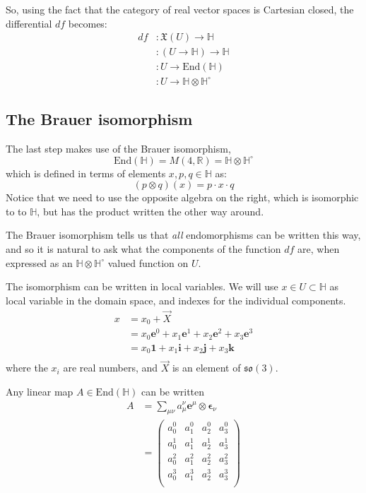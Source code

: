 \documentclass{amsart}
\providecommand{\R}{\mathbb{R}}
\providecommand{\HH}{\mathbb{H}}
\providecommand{\so}{\mathfrak{so}}
\newcommand{\End}{\mathrm{End}}
\begin{document}
So, using the fact that the category of real vector spaces is Cartesian closed,
the differential $df$ becomes:
\begin{align*}
  df &: \mathfrak{X}(U) \to \HH \\
     &: (U \to \HH) \to \HH \\
     &: U \to \End(\HH) \\
     &: U \to \HH \otimes \HH^\circ
\end{align*}



\subsection{The Brauer isomorphism}

The last step makes use of the Brauer isomorphism,
$$ \End(\HH) = M(4, \R) = \HH \otimes \HH^\circ $$
which is defined in terms of elements $x,p,q\in\HH$ as:
$$ (p\otimes q)(x) = p \cdot x \cdot q $$
Notice that we need to use the opposite algebra on the right, which is
isomorphic to to $\HH$, but has the product written the other way around.

The Brauer isomorphism tells us that \emph{all} endomorphisms can be written
this way, and so it is natural to ask what the components of the function $df$
are, when expressed as an $\HH\otimes\HH^\circ$ valued function on $U$.

The isomorphism can be written in local variables. We will use $x\in U\subset
\HH$ as local variable in the domain space, and indexes for the individual
components.
\begin{align*}
  x &= x_0 + \vec{X} \\
    &= x_0\boldsymbol{e}^0 + x_1\boldsymbol{e}^1 + x_2\boldsymbol{e}^2 + x_3\boldsymbol{e}^3 \\
    &= x_0\boldsymbol{1} + x_1\boldsymbol{i} + x_2\boldsymbol{j} + x_3\boldsymbol{k} \\
\end{align*}
where the $x_i$ are real numbers, and $\vec{X}$ is an element of $\so(3)$.

Any linear map $A \in \End(\HH) $ can be written
\begin{align*}
  A &= \sum_{\mu\nu} a_\mu^\nu \boldsymbol{e}^\mu \otimes \boldsymbol{\epsilon}_\nu \\
    &= \begin{pmatrix}
      a_0^0 & a_1^0 & a_2^0 & a_3^0 \\
      a_0^1 & a_1^1 & a_2^1 & a_3^1 \\
      a_0^2 & a_1^2 & a_2^2 & a_3^2 \\
      a_0^3 & a_1^3 & a_2^3 & a_3^3 \\
    \end{pmatrix}
\end{align*}
\end{document}
